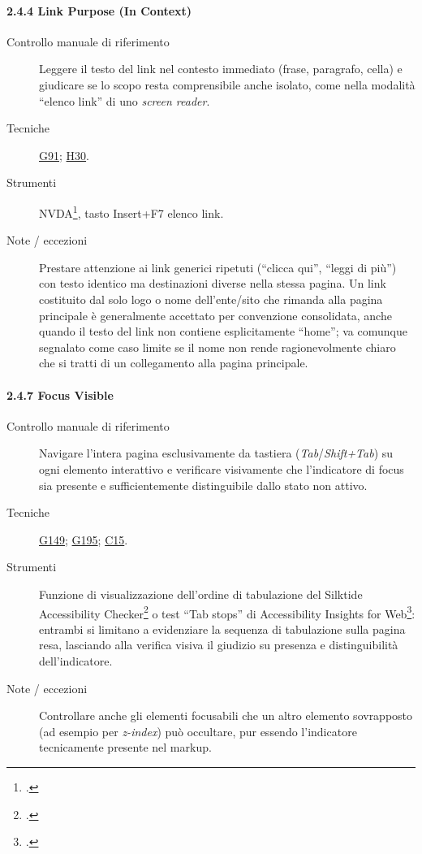 \paragraph*{2.4.4 Link Purpose (In Context)}
\begin{description}
\item[Controllo manuale di riferimento] Leggere il testo del link nel contesto immediato (frase, paragrafo, cella) e giudicare se lo scopo resta comprensibile anche isolato, come nella modalità \enquote{elenco link} di uno \emph{screen reader}.
\item[Tecniche] \href{https://www.w3.org/WAI/WCAG21/Techniques/general/G91.html}{G91}; \href{https://www.w3.org/WAI/WCAG21/Techniques/html/H30.html}{H30}.
\item[Strumenti] NVDA\footcite{nvda:screenreader}, tasto Insert+F7 \textrightarrow{} elenco link.
\item[Note / eccezioni] Prestare attenzione ai link generici ripetuti (\enquote{clicca qui}, \enquote{leggi di più}) con testo identico ma destinazioni diverse nella stessa pagina. Un link costituito dal solo logo o nome dell'ente/sito che rimanda alla pagina principale è generalmente accettato per convenzione consolidata, anche quando il testo del link non contiene esplicitamente \enquote{home}; va comunque segnalato come caso limite se il nome non rende ragionevolmente chiaro che si tratti di un collegamento alla pagina principale.
\end{description}

\paragraph*{2.4.7 Focus Visible}
\begin{description}
\item[Controllo manuale di riferimento] Navigare l'intera pagina esclusivamente da tastiera (\emph{Tab}/\emph{Shift+Tab}) su ogni elemento interattivo e verificare visivamente che l'indicatore di focus sia presente e sufficientemente distinguibile dallo stato non attivo.
\item[Tecniche] \href{https://www.w3.org/WAI/WCAG21/Techniques/general/G149.html}{G149}; \href{https://www.w3.org/WAI/WCAG22/Techniques/general/G195}{G195}; \href{https://www.w3.org/WAI/WCAG21/Techniques/css/C15.html}{C15}.
\item[Strumenti] Funzione di visualizzazione dell'ordine di tabulazione del Silktide Accessibility Checker\footcite{silktide:toolbar} o test \enquote{Tab stops} di Accessibility Insights for Web\footcite{accessibilityinsights:tabstops}: entrambi si limitano a evidenziare la sequenza di tabulazione sulla pagina resa, lasciando alla verifica visiva il giudizio su presenza e distinguibilità dell'indicatore.
\item[Note / eccezioni] Controllare anche gli elementi focusabili che un altro elemento sovrapposto (ad esempio per \emph{z-index}) può occultare, pur essendo l'indicatore tecnicamente presente nel markup.
\end{description}

